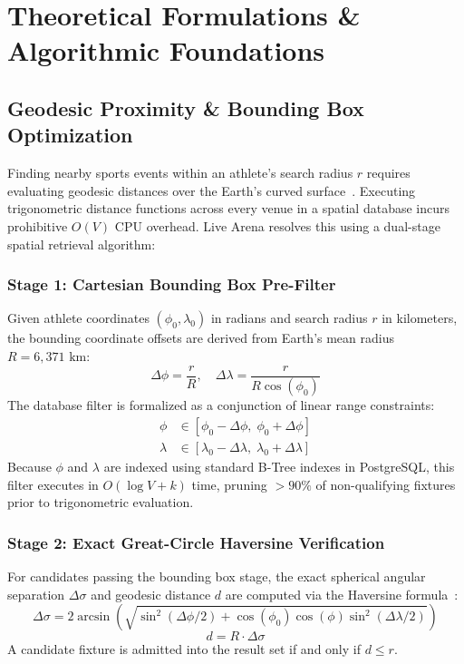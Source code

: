 \documentclass[conference]{IEEEtran}
\begin{document}
\section{Theoretical Formulations \& Algorithmic Foundations}

\subsection{Geodesic Proximity \& Bounding Box Optimization}
Finding nearby sports events within an athlete's search radius $r$ requires evaluating geodesic distances over the Earth's curved surface~\cite{chopde2013landmark, zhang2022spatial}. Executing trigonometric distance functions across every venue in a spatial database incurs prohibitive $O(V)$ CPU overhead. Live Arena resolves this using a dual-stage spatial retrieval algorithm:

\subsubsection{Stage 1: Cartesian Bounding Box Pre-Filter}
Given athlete coordinates $(\phi_0, \lambda_0)$ in radians and search radius $r$ in kilometers, the bounding coordinate offsets are derived from Earth's mean radius $R = 6,371\text{ km}$:
\begin{equation}
\Delta\phi = \frac{r}{R}, \quad \Delta\lambda = \frac{r}{R \cos(\phi_0)}
\end{equation}
The database filter is formalized as a conjunction of linear range constraints:
\begin{align}
\phi &\in [\phi_0 - \Delta\phi, \;\phi_0 + \Delta\phi] \\
\lambda &\in [\lambda_0 - \Delta\lambda, \;\lambda_0 + \Delta\lambda]
\end{align}
Because $\phi$ and $\lambda$ are indexed using standard B-Tree indexes in PostgreSQL, this filter executes in $O(\log V + k)$ time, pruning $>90\%$ of non-qualifying fixtures prior to trigonometric evaluation.

\subsubsection{Stage 2: Exact Great-Circle Haversine Verification}
For candidates passing the bounding box stage, the exact spherical angular separation $\Delta\sigma$ and geodesic distance $d$ are computed via the Haversine formula~\cite{chopde2013landmark}:
\begin{equation}
\Delta\sigma = 2 \arcsin \!\left( \!\sqrt{\sin^2(\Delta\phi/2) + \cos(\phi_0)\cos(\phi) \sin^2(\Delta\lambda/2)} \right)
\end{equation}
\begin{equation}
d = R \cdot \Delta\sigma
\end{equation}
A candidate fixture is admitted into the result set if and only if $d \le r$.
\end{document}
